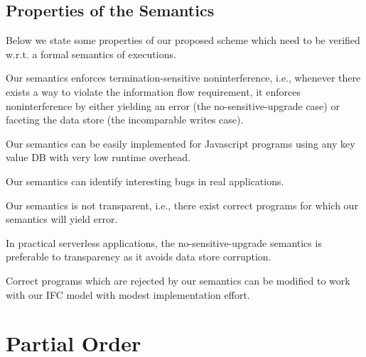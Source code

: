 \subsection{Properties of the Semantics}

Below we state some properties of our proposed scheme which need to be verified w.r.t.
a formal semantics of executions.

\begin{conj}
Our semantics enforces termination-sensitive noninterference, i.e., whenever there exists
a way to violate the information flow requirement, it enforces noninterference by either yielding an error (the no-sensitive-upgrade case)
or faceting the data store (the incomparable writes case).
\end{conj}

\begin{conj}
Our semantics can be easily implemented for Javascript programs using
any key value DB with very low runtime overhead.
\end{conj}

\begin{conj}
Our semantics can identify interesting bugs in real applications.
\end{conj}

\begin{conj}
Our semantics is not transparent, i.e., there exist correct programs for which our semantics
will yield error.
\end{conj}

\begin{conj}
In practical serverless applications, the no-sensitive-upgrade semantics is preferable to transparency
as it avoids data store corruption.
\end{conj}

\begin{conj}
Correct programs which are rejected by our semantics can be modified to work with our IFC model with modest implementation effort.
\end{conj}

\section{Partial Order}
